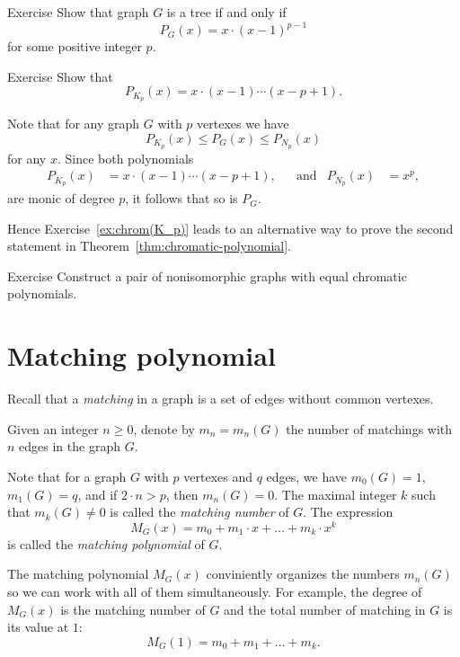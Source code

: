 \begin{thm}{Exercise} Show that graph $G$ is a tree if and only if
\[P_G(x)= x\cdot(x-1)^{p-1}\]
for some positive integer $p$.
\end{thm}


\begin{thm}{Exercise}\label{ex:chrom(K_p)}
Show that 
\[P_{K_p}(x)=x\cdot(x-1)\cdots(x-p+1).\]

\end{thm}

Note that for any graph $G$ with $p$ vertexes we have
\[P_{K_p}(x)\le P_G(x)\le P_{N_p}(x)\]
for any $x$.
Since both polynomials
\begin{align*}
P_{K_p}(x)&=x\cdot(x-1)\cdots(x-p+1),&&
\text{and}
&
P_{N_p}(x)&=x^p,
\end{align*}
are monic of degree $p$,
it follows that so is $P_G$.

Hence Exercise~\ref{ex:chrom(K_p)} leads to an alternative way to prove the second statement in Theorem~\ref{thm:chromatic-polynomial}.

\begin{thm}{Exercise}
Construct a pair of nonisomorphic graphs with equal chromatic polynomials.
\end{thm}

\section*{Matching polynomial}

Recall that a \emph{matching} in a graph is a set of edges without common vertexes.

Given an integer $n\ge0$,
denote by $m_n=m_n(G)$ the number of matchings with $n$ edges in the graph $G$.

Note that for a graph $G$ with $p$ vertexes and $q$ edges, we have 
$m_0(G)=1$, 
$m_1(G)=q$, 
and if $2\cdot n>p$, then $m_n(G)=0$.
The maximal integer $k$ such that $m_k(G)\ne0$ is called the \emph{matching number} of $G$.
The expression 
\[M_G(x)=m_0+m_1\cdot x+\dots +m_k\cdot x^k\]
is called the \emph{matching polynomial} of $G$.

The matching polynomial $M_G(x)$ conviniently organizes the numbers $m_n(G)$ so we can work with all of them simultaneously.
For example, the degree of $M_G(x)$ is the matching number of $G$ and
the total number of matching in $G$ is its value at $1$:  
\[M_G(1)=m_0+m_1+\dots +m_k.\]

